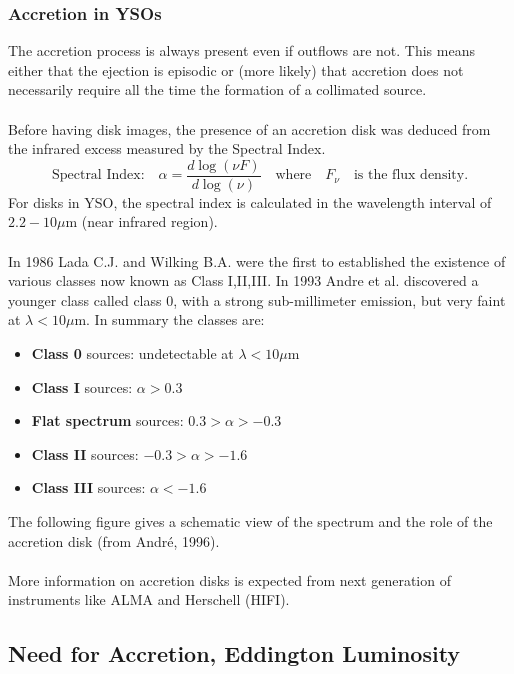 \documentclass[10pt,a4paper,english]{article}
\begin{document}
\subsubsection{Accretion in YSOs}
The accretion process is always present even if outflows are not. This means either that the ejection is episodic or (more likely) that accretion does not necessarily require all the time the formation of a collimated source.\\
\\
Before having disk images, the presence of an accretion disk was deduced from the infrared excess measured by the Spectral Index.
\[\text{Spectral Index:}\quad \alpha=\frac{d\log(\nu F)}{d \log(\nu)}\quad\text{where}\quad F_{\nu}\quad\text{is the flux density.}\]
For disks in YSO, the spectral index is calculated in the wavelength interval of $2.2-10 \mu$m (near infrared region).\\
\\
In 1986 Lada C.J. and Wilking B.A. were the first to established the existence of various classes now known as Class I,II,III. In 1993 Andre et al. discovered a younger class called class 0, with a strong sub-millimeter emission, but very faint at $\lambda<10\mu$m. In summary the classes are:
\begin{itemize}
\item \textbf{Class 0} sources: undetectable at $\lambda<10\mu$m
\item \textbf{Class I} sources: $\alpha>0.3$
\item \textbf{Flat spectrum} sources: $0.3>\alpha>-0.3$
\item \textbf{Class II} sources: $-0.3>\alpha>-1.6$
\item \textbf{Class III} sources: $\alpha<-1.6$
\end{itemize}
The following figure gives a schematic view of the spectrum and the role of the accretion disk (from André, 1996).\\
\\
More information on accretion disks is expected from next generation of instruments like ALMA and Herschell (HIFI).
\subsection{Need for Accretion, Eddington Luminosity}
\end{document}
